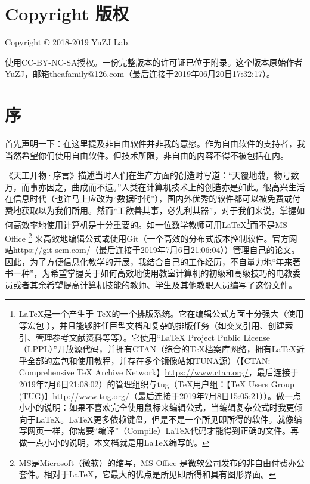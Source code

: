 \section{Copyright 版权}
Copyright \copyright{} 2018-2019 YuZJ Lab. \par
使用CC-BY-NC-SA授权。一份完整版本的许可证已位于附录。这个版本原始作者YuZJ，邮箱\url{theafamily@126.com}（最后连接于2019年06月20日17:32:17）。
\begin{center}\large \bf {\color{red}{对本文档所引起的任何后果不作担保！}}\normalall\end{center}
\section{序}
首先声明一下：在这里提及非自由软件并非我的意愿。作为自由软件的支持者，我当然希望你们使用自由软件。但技术所限，非自由的内容不得不被包括在内。\par
《天工开物·序言》描述当时人们在生产方面的创造时写道：“天覆地载，物号数万，而事亦因之，曲成而不遗。”人类在计算机技术上的创造亦是如此。很高兴生活在信息时代（也许马上应改为“数据时代”），国内外优秀的软件都可以被免费或付费地获取以为我们所用。然而“工欲善其事，必先利其器”，对于我们来说，掌握如何高效率地使用计算机是十分重要的。如一位数学教师可用\LaTeX\footnote{\LaTeX 是一个产生于 \TeX 的一个排版系统。它在编辑公式方面十分强大（使用 \AmSTeX 等宏包 ），并且能够胜任巨型文档和复杂的排版任务（如交叉引用、创建索引、管理参考文献资料等等）。它使用“LaTeX Project Public Li­cense （LPPL）”开放源代码，并拥有CTAN（综合的TeX档案库网络，拥有\LaTeX 近乎全部的宏包和使用教程，并存在多个镜像站如TUNA源）（【CTAN: Comprehensive TeX Archive Network】\url{https://www.ctan.org/}，最后连接于2019年7月6日21:08:02）的管理组织与tug（\TeX 用户组：【TeX Users Group (TUG)】\url{http://www.tug.org/}（最后连接于2019年7月8日15:05:21））。做一点小小的说明：如果不喜欢完全使用鼠标来编辑公式，当编辑复杂公式时我更倾向于\LaTeX。\LaTeX 更多依赖键盘，但是不是一个所见即所得的软件。就像编写网页一样，你需要“编译”（Compile）\LaTeX 代码才能得到正确的文件。再做一点小小的说明，本文档就是用\LaTeX 编写的。}而不是MS Office \footnote{MS是Microsoft（微软）的缩写，MS Office 是微软公司发布的非自由付费办公套件。相对于\LaTeX ，它最大的优点是所见即所得和具有图形界面。} 来高效地编辑公式或使用Git（一个高效的分布式版本控制软件。官方网站\url{https://git-scm.com/}（最后连接于2019年7月6日21:06:04））管理自己的论文。因此，为了方便信息化教学的开展，我结合自己的工作经历，不自量力地“年来著书一种”，为希望掌握关于如何高效地使用教室计算机的初级和高级技巧的电教委员或者其余希望提高计算机技能的教师、学生及其他教职人员编写了这份文件。\par
